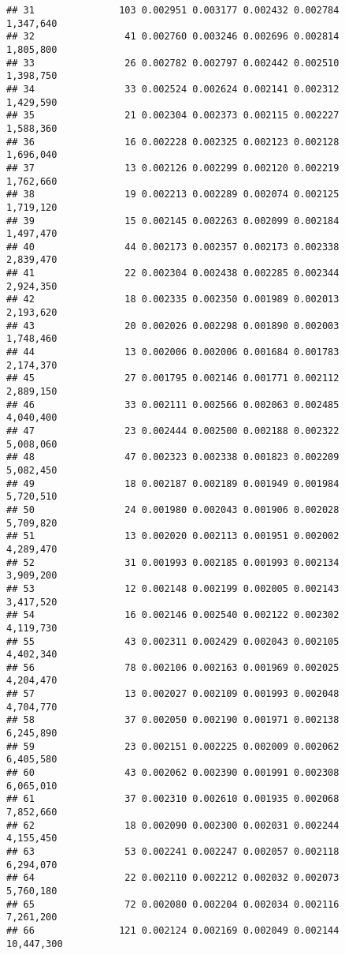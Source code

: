 \documentclass[]{article}
\begin{document}
\begin{verbatim}
## 31               103 0.002951 0.003177 0.002432 0.002784     1,347,640
## 32                41 0.002760 0.003246 0.002696 0.002814     1,805,800
## 33                26 0.002782 0.002797 0.002442 0.002510     1,398,750
## 34                33 0.002524 0.002624 0.002141 0.002312     1,429,590
## 35                21 0.002304 0.002373 0.002115 0.002227     1,588,360
## 36                16 0.002228 0.002325 0.002123 0.002128     1,696,040
## 37                13 0.002126 0.002299 0.002120 0.002219     1,762,660
## 38                19 0.002213 0.002289 0.002074 0.002125     1,719,120
## 39                15 0.002145 0.002263 0.002099 0.002184     1,497,470
## 40                44 0.002173 0.002357 0.002173 0.002338     2,839,470
## 41                22 0.002304 0.002438 0.002285 0.002344     2,924,350
## 42                18 0.002335 0.002350 0.001989 0.002013     2,193,620
## 43                20 0.002026 0.002298 0.001890 0.002003     1,748,460
## 44                13 0.002006 0.002006 0.001684 0.001783     2,174,370
## 45                27 0.001795 0.002146 0.001771 0.002112     2,889,150
## 46                33 0.002111 0.002566 0.002063 0.002485     4,040,400
## 47                23 0.002444 0.002500 0.002188 0.002322     5,008,060
## 48                47 0.002323 0.002338 0.001823 0.002209     5,082,450
## 49                18 0.002187 0.002189 0.001949 0.001984     5,720,510
## 50                24 0.001980 0.002043 0.001906 0.002028     5,709,820
## 51                13 0.002020 0.002113 0.001951 0.002002     4,289,470
## 52                31 0.001993 0.002185 0.001993 0.002134     3,909,200
## 53                12 0.002148 0.002199 0.002005 0.002143     3,417,520
## 54                16 0.002146 0.002540 0.002122 0.002302     4,119,730
## 55                43 0.002311 0.002429 0.002043 0.002105     4,402,340
## 56                78 0.002106 0.002163 0.001969 0.002025     4,204,470
## 57                13 0.002027 0.002109 0.001993 0.002048     4,704,770
## 58                37 0.002050 0.002190 0.001971 0.002138     6,245,890
## 59                23 0.002151 0.002225 0.002009 0.002062     6,405,580
## 60                43 0.002062 0.002390 0.001991 0.002308     6,065,010
## 61                37 0.002310 0.002610 0.001935 0.002068     7,852,660
## 62                18 0.002090 0.002300 0.002031 0.002244     4,155,450
## 63                53 0.002241 0.002247 0.002057 0.002118     6,294,070
## 64                22 0.002110 0.002212 0.002032 0.002073     5,760,180
## 65                72 0.002080 0.002204 0.002034 0.002116     7,261,200
## 66               121 0.002124 0.002169 0.002049 0.002144    10,447,300

\end{verbatim}
\end{document}
